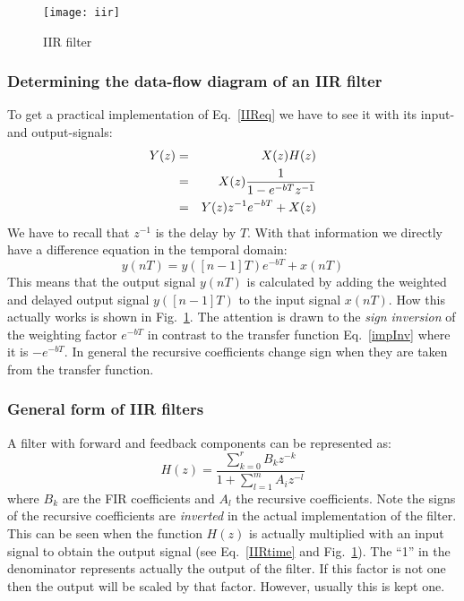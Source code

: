 \documentclass[12pt,a4paper]{article}
\begin{document}
\begin{figure}[!hbt]
\begin{center}
\mbox{\texttt{[image: iir]}}
\caption{IIR filter \label{IIRfilter}}
\end{center}
\end{figure}



\subsubsection{Determining the data-flow diagram of an IIR filter}
To get a practical implementation of Eq.~\ref{IIReq} we have
to see it with its input- and output-signals:
\begin{eqnarray}
Y(z)&=&X(z)H(z)\\
    &=&X(z) {1\over 1-e^{-bT} z^{-1}} \\
    &=&Y(z)z^{-1}e^{-bT}+X(z)
\label{Verg}
\end{eqnarray}
We have to recall that $z^{-1}$ is the delay by $T$. With that
information we directly have a difference equation in the
temporal domain:
\begin{equation}
y(nT)=y([n-1]T) e^{-bT} + x(nT)
\label{IIRtime}
\end{equation}
This means that the output signal $y(nT)$ is calculated by
adding the weighted and delayed output signal $y([n-1]T)$ 
to the input signal $x(nT)$.
How this actually works is shown in Fig.~\ref{IIRfilter}.
The attention is drawn to the \textsl{sign inversion} of the weighting
factor $e^{-bT}$ in contrast to the transfer function 
Eq.~\ref{impInv} where it is $-e^{-bT}$. In general the recursive
coefficients change sign when they are taken from the transfer
function.



\subsubsection{General form of IIR filters}
A filter with forward and feedback components can be represented as:
\begin{equation} 
H(z) = \frac{\sum_{k = 0}^{r} B_{k} z^{-k}}{1 + \sum_{l = 1}^{m} A_{i} z^{-l}} \end{equation}
where $B_k$ are the FIR coefficients and $A_l$ the recursive coefficients.
Note the signs of the recursive coefficients are \textsl{inverted} in the
actual implementation of the filter. This can be seen when the
function $H(z)$ is actually multiplied with an input signal to
obtain the output signal (see Eq.~\ref{IIRtime} and Fig.~\ref{IIRfilter}).
The ``1'' in the denominator represents actually the output of
the filter. If this factor is not one then the output will be scaled
by that factor. However, usually this is kept one.
\end{document}
